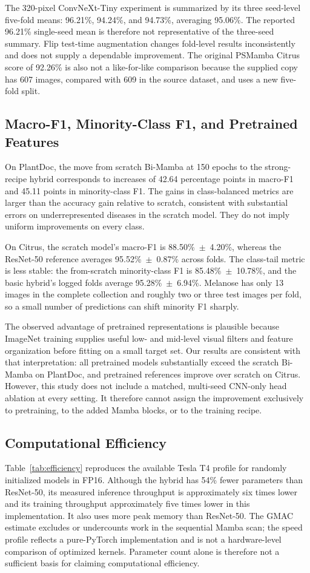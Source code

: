 \documentclass[conference]{IEEEtran}
\begin{document}
The 320-pixel ConvNeXt-Tiny experiment is summarized by its three seed-level five-fold means: 96.21\%, 94.24\%, and 94.73\%, averaging 95.06\%. The reported 96.21\% single-seed mean is therefore not representative of the three-seed summary. Flip test-time augmentation changes fold-level results inconsistently and does not supply a dependable improvement. The original PSMamba Citrus score of 92.26\% is also not a like-for-like comparison because the supplied copy has 607 images, compared with 609 in the source dataset, and uses a new five-fold split.

\subsection{Macro-F1, Minority-Class F1, and Pretrained Features}
On PlantDoc, the move from scratch Bi-Mamba at 150 epochs to the strong-recipe hybrid corresponds to increases of 42.64 percentage points in macro-F1 and 45.11 points in minority-class F1. The gains in class-balanced metrics are larger than the accuracy gain relative to scratch, consistent with substantial errors on underrepresented diseases in the scratch model. They do not imply uniform improvements on every class.

On Citrus, the scratch model's macro-F1 is 88.50\%~$\pm$~4.20\%, whereas the ResNet-50 reference averages 95.52\%~$\pm$~0.87\% across folds. The class-tail metric is less stable: the from-scratch minority-class F1 is 85.48\%~$\pm$~10.78\%, and the basic hybrid's logged folds average 95.28\%~$\pm$~6.94\%. Melanose has only 13 images in the complete collection and roughly two or three test images per fold, so a small number of predictions can shift minority F1 sharply.

The observed advantage of pretrained representations is plausible because ImageNet training supplies useful low- and mid-level visual filters and feature organization before fitting on a small target set. Our results are consistent with that interpretation: all pretrained models substantially exceed the scratch Bi-Mamba on PlantDoc, and pretrained references improve over scratch on Citrus. However, this study does not include a matched, multi-seed CNN-only head ablation at every setting. It therefore cannot assign the improvement exclusively to pretraining, to the added Mamba blocks, or to the training recipe.

\subsection{Computational Efficiency}
Table~\ref{tab:efficiency} reproduces the available Tesla T4 profile for randomly initialized models in FP16. Although the hybrid has 54\% fewer parameters than ResNet-50, its measured inference throughput is approximately six times lower and its training throughput approximately five times lower in this implementation. It also uses more peak memory than ResNet-50. The GMAC estimate excludes or undercounts work in the sequential Mamba scan; the speed profile reflects a pure-PyTorch implementation and is not a hardware-level comparison of optimized kernels. Parameter count alone is therefore not a sufficient basis for claiming computational efficiency.
\EfficiencyTable
\end{document}
